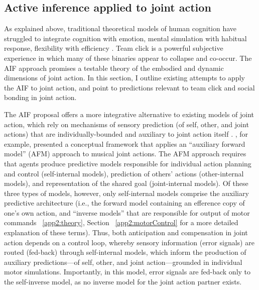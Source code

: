 \begin{CJK}{UTF8}{gbsn}
\section{Active inference applied to joint action \label{sect:activeInfJA}}
As explained above, traditional theoretical models of human cognition have struggled to integrate cognition with emotion, mental simulation with habitual response, flexibility with efficiency \citep{Clark2015}.
Team click is a powerful subjective experience in which many of these binaries appear to collapse and co-occur.  The AIF approach promises a testable theory of the embodied and dynamic dimensions of joint action.  In this section, I outline existing attempts to apply the AIF to joint action, and point to predictions relevant to team click and social bonding in joint action.

The AIF proposal offers a more integrative alternative to existing models of joint action, which rely on mechanisms of sensory prediction (of self, other, and joint actions) that are individually-bounded and auxiliary to joint action itself \citep{Pesquita2017}.   \textcite{Keller2016}, for example, presented a conceptual framework that applies an ``auxiliary forward model'' (AFM) approach to musical joint actions.  The AFM approach requires that agents produce predictive models responsible for individual action planning and control (self-internal models), prediction of others' actions (other-internal models), and representation of the shared goal (joint-internal models).  Of these three types of models, however, only self-internal models comprise the auxiliary predictive architecture (i.e., the forward model containing an efference copy of one's own action, and ``inverse models'' that are responsible for output of motor commands ~\ref{app2:theory}, Section ~\ref{app2:motorControl} for a more detailed explanation of these terms).  Thus, both anticipation and compensation in joint action depends on a control loop, whereby sensory information (error signals) are routed (fed-back) through self-internal models, which inform the production of auxiliary predictions---of self, other, and joint action---grounded in individual motor simulations.  Importantly, in this model,  error signals are fed-back only to the self-inverse model, as no inverse model for the joint action partner exists.


\end{CJK}

